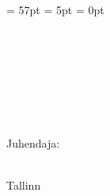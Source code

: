 \begin{titlepage}
\headheight = 57pt
\footskip = 5pt
\headsep = 0pt

\centering
\universityEst\\
\schoolEst

\vspace*{4.5 cm}

\begin{center}

\meEst{\authorName}\studentcodeEst{\studentcode}\\
\ifthenelse{\equal{\authorNameTwo}{}}{}{\authorNameTwo\ \studentcodeTwo\\}
\ifthenelse{\equal{\authorNameThree}{}}{}{\authorNameThree\ \studentcodeThree\\}
\vspace*{1.5 cm}

\begin{Large}
\textsc{\textbf{\doctitleEst}}\\
\end{Large}

\vspace*{1.5 cm}
\doctypeEst{\doctype}\\
\end{center}

\vspace*{0.6 cm}

\begin{flushright}
Juhendaja: \supervisorEst{\supervisor}\\\supervisortitleEst{\supervisortitle}\\
\vspace*{0.2 cm}
\end{flushright}
\vfill

Tallinn \Year
\end{titlepage}